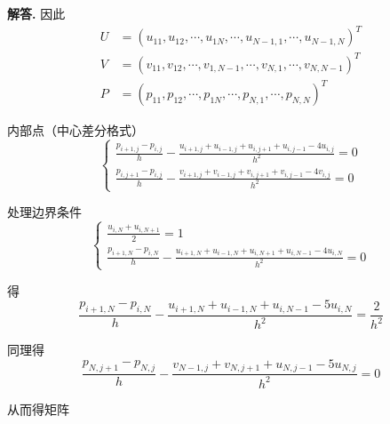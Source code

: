 \documentclass{article}
\newenvironment{solution}{\par\noindent\textbf{解答. }}{\par}
\begin{document}
\begin{solution}
因此
\begin{align*}
	U &= \left(u_{11},u_{12},\cdots,u_{1N},\cdots,u_{N-1,1},\cdots,u_{N-1,N}\right)^T\\ 
	V &= \left(v_{11},v_{12},\cdots,v_{1,N-1},\cdots,v_{N,1},\cdots,v_{N,N-1}\right)^T\\ 
	P &= \left(p_{11},p_{12},\cdots,p_{1N},\cdots,p_{N,1},\cdots,p_{N,N}\right)^T
\end{align*}

内部点（中心差分格式）
\begin{equation*}
	\left\{\begin{matrix}
		\frac{p_{i+1,j}-p_{i,j}}{h}-\frac{u_{i+1,j}+u_{i-1,j}+u_{i,j+1}+u_{i,j-1}-4u_{i,j}}{h^2}=0\\ 
		\frac{p_{i,j+1}-p_{i,j}}{h}-\frac{v_{i+1,j}+v_{i-1,j}+v_{i,j+1}+v_{i,j-1}-4v_{i,j}}{h^2}=0
	\end{matrix}\right.
\end{equation*}

处理边界条件
\begin{equation*}
	\left\{\begin{matrix}
		\frac{u_{i,N}+u_{i,N+1}}{2}=1\\ 
		\frac{p_{i+1,N}-p_{i,N}}{h}-\frac{u_{i+1,N}+u_{i-1,N}+u_{i,N+1}+u_{i,N-1}-4u_{i,N}}{h^2}=0
	\end{matrix}\right.
\end{equation*}

得\begin{equation*}
	\frac{p_{i+1,N}-p_{i,N}}{h}-\frac{u_{i+1,N}+u_{i-1,N}+u_{i,N-1}-5u_{i,N}}{h^2}=\frac{2}{h^2}
\end{equation*}
\end{solution}

同理得
\begin{equation*}
	\frac{p_{N,j+1}-p_{N,j}}{h}-\frac{v_{N-1,j}+v_{N,j+1}+u_{N,j-1}-5u_{N,j}}{h^2}=0
\end{equation*}

从而得矩阵
\end{document}
